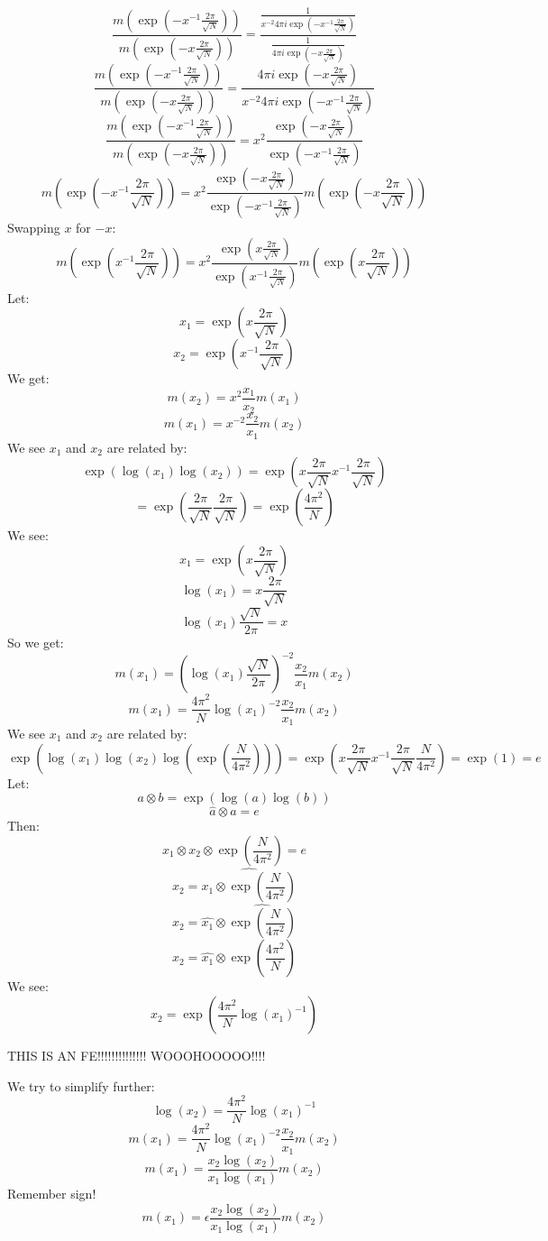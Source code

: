\documentclass[a4paper]{amsart}
\begin{document}
$$\frac{m(\exp\left(-x^{-1}\frac{2\pi}{\sqrt{N}}\right))}{m(\exp\left(-x\frac{2\pi}{\sqrt{N}}\right))} = \frac{\frac{1}{x^{-2}4\pi i \exp\left(-x^{-1}\frac{2\pi}{\sqrt{N}}\right)} }{\frac{1}{4\pi i \exp\left(-x\frac{2\pi}{\sqrt{N}}\right)}}$$
$$\frac{m(\exp\left(-x^{-1}\frac{2\pi}{\sqrt{N}}\right))}{m(\exp\left(-x\frac{2\pi}{\sqrt{N}}\right))} = \frac{4\pi i \exp\left(-x\frac{2\pi}{\sqrt{N}}\right)}{x^{-2}4\pi i \exp\left(-x^{-1}\frac{2\pi}{\sqrt{N}}\right)}$$
$$\frac{m(\exp\left(-x^{-1}\frac{2\pi}{\sqrt{N}}\right))}{m(\exp\left(-x\frac{2\pi}{\sqrt{N}}\right))} = x^2 \frac{\exp\left(-x\frac{2\pi}{\sqrt{N}}\right)}{\exp\left(-x^{-1}\frac{2\pi}{\sqrt{N}}\right)}$$
$$m\left(\exp\left(-x^{-1}\frac{2\pi}{\sqrt{N}}\right)\right) = x^2 \frac{\exp\left(-x\frac{2\pi}{\sqrt{N}}\right)}{\exp\left(-x^{-1}\frac{2\pi}{\sqrt{N}}\right)}m\left(\exp\left(-x\frac{2\pi}{\sqrt{N}}\right)\right)$$
Swapping $x$ for $-x$:
$$m\left(\exp\left(x^{-1}\frac{2\pi}{\sqrt{N}}\right)\right) = x^2 \frac{\exp\left(x\frac{2\pi}{\sqrt{N}}\right)}{\exp\left(x^{-1}\frac{2\pi}{\sqrt{N}}\right)}m\left(\exp\left(x\frac{2\pi}{\sqrt{N}}\right)\right)$$
Let:
$$x_1 = \exp\left(x\frac{2\pi}{\sqrt{N}}\right)$$
$$x_2 = \exp\left(x^{-1}\frac{2\pi}{\sqrt{N}}\right)$$
We get:
$$m(x_2) = x^2 \frac{x_1}{x_2}m(x_1)$$
$$m(x_1) = x^{-2} \frac{x_2}{x_1}m(x_2)$$
We see $x_1$ and $x_2$ are related by:
$$\exp(\log(x_1)\log(x_2)) = \exp(x\frac{2\pi}{\sqrt{N}}x^{-1}\frac{2\pi}{\sqrt{N}})$$
$$ = \exp(\frac{2\pi}{\sqrt{N}}\frac{2\pi}{\sqrt{N}}) = \exp\left(\frac{4\pi^2}{N}\right)$$
We see: 
$$x_1 = \exp\left(x\frac{2\pi}{\sqrt{N}}\right)$$
$$\log(x_1) = x\frac{2\pi}{\sqrt{N}}$$
$$\log(x_1)\frac{\sqrt{N}}{2\pi} = x$$
So we get:
$$m(x_1) = (\log(x_1)\frac{\sqrt{N}}{2\pi})^{-2} \frac{x_2}{x_1}m(x_2)$$
$$m(x_1) = \frac{4\pi^2}{N}\log(x_1)^{-2} \frac{x_2}{x_1}m(x_2)$$
We see $x_1$ and $x_2$ are related by:
$$\exp(\log(x_1)\log(x_2)\log(\exp(\frac{N}{4\pi^2}))) = \exp(x\frac{2\pi}{\sqrt{N}}x^{-1}\frac{2\pi}{\sqrt{N}}\frac{N}{4\pi^2}) = \exp(1) = e$$
Let: 
$$a \otimes b = \exp(\log(a)\log(b))$$
$$\hat{a} \otimes a = e$$
Then: 
$$x_1 \otimes x_2 \otimes \exp(\frac{N}{4\pi^2}) = e$$
$$x_2 = \widehat{x_1 \otimes \exp(\frac{N}{4\pi^2})}$$
$$x_2 = \hat{x_1} \otimes \widehat{\exp(\frac{N}{4\pi^2})}$$
$$x_2 = \hat{x_1} \otimes \exp\left(\frac{4\pi^2}{N}\right)$$
We see:
$$x_2 = \exp(\frac{4\pi^2}{N}\log(x_1)^{-1})$$

THIS IS AN FE!!!!!!!!!!!!!! WOOOHOOOOO!!!!

We try to simplify further:
$$\log(x_2) = \frac{4\pi^2}{N}\log(x_1)^{-1}$$
$$m(x_1) = \frac{4\pi^2}{N}\log(x_1)^{-2} \frac{x_2}{x_1}m(x_2)$$
$$m(x_1) = \frac{x_2\log(x_2)}{x_1\log(x_1)}m(x_2)$$
Remember sign!
$$m(x_1) = \epsilon\frac{x_2\log(x_2)}{x_1\log(x_1)}m(x_2)$$
\end{document}
